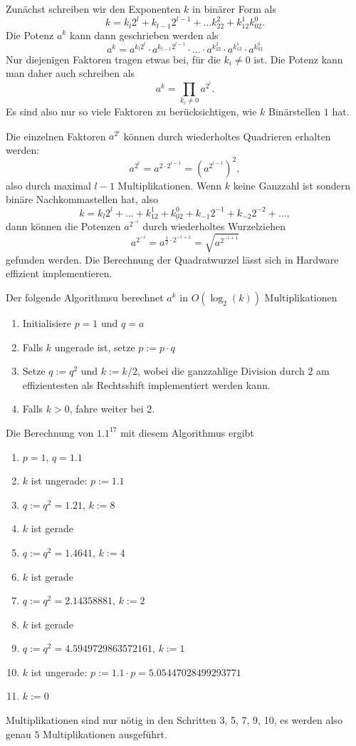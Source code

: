 Zunächst schreiben wir den Exponenten $k$ in binärer Form als
\[
k = k_l2^l + k_{l-1}2^{l-1} + \dots k_22^2+k_12^1 k_02^0.
\]
Die Potenz $a^k$ kann dann geschrieben werden als
\[
a^k
=
a^{k_l2^l} \cdot a^{k_{l-1}2^{l-1}} \cdot \dots \cdot
a^{k_22^2} \cdot a^{k_12^1} \cdot a^{k_02^0}
\]
Nur diejenigen Faktoren tragen etwas bei, für die $k_i\ne 0$ ist.
Die Potenz kann man daher auch schreiben als
\[
a^k
=
\prod_{k_i\ne 0} a^{2^i}.
\]
Es sind also nur so viele Faktoren zu berücksichtigen, wie $k$ 
Binärstellen $1$ hat.

Die einzelnen Faktoren $a^{2^i}$ können durch wiederholtes Quadrieren
erhalten werden:
\[
a^{2^i} = a^{2\cdot 2^{i-1}} = (a^{2^{i-1}})^2,
\]
also durch maximal $l-1$ Multiplikationen.
Wenn $k$ keine Ganzzahl ist sondern binäre Nachkommastellen hat, also
\[
k=k_l2^l + \dots + k_12^1 + k_02^0 + k_{-1}2^{-1} + k_{-2}2^{-2}+\dots,
\]
dann können die Potenzen $a^{2^{-i}}$ durch wiederholtes Wurzelziehen
\[
a^{2^{-i}} = a^{\frac12\cdot 2^{-i+1}} = \sqrt{a^{2^{-i+1}}}
\]
gefunden werden.
Die Berechnung der Quadratwurzel lässt sich in Hardware effizient
implementieren.

\begin{algorithmus}
Der folgende Algorithmsu berechnet $a^k$ in $O(\log_2(k))$
Multiplikationen
\begin{enumerate}
\item Initialisiere $p=1$ und $q=a$
\item Falls $k$ ungerade ist, setze $p:=p\cdot q$ 
\item Setze $q:=q^2$ und $k := k/2$, wobei die ganzzahlige Division durch $2$
am effizientesten als Rechtsshift implementiert werden kann.
\item Falls $k>0$, fahre weiter bei 2.
\end{enumerate}
\end{algorithmus}

\begin{beispiel}
Die Berechnung von $1.1^{17}$ mit diesem Algorithmus ergibt
\begin{enumerate}
\item $p=1$, $q=1.1$
\item $k$ ist ungerade: $p:=1.1$
\item $q:=q^2=1.21$, $k := 8$
\item $k$ ist gerade
\item $q:=q^2=1.4641$, $k := 4$
\item $k$ ist gerade
\item $q:=q^2=2.14358881$, $k := 2$
\item $k$ ist gerade
\item $q:=q^2=4.5949729863572161$, $k := 1$
\item $k$ ist ungerade: $p:=1.1\cdot p = 5.05447028499293771$
\item $k:=0$
\end{enumerate}
Multiplikationen sind nur nötig in den Schritten 3, 5, 7, 9, 10, es
werden also genau $5$ Multiplikationen ausgeführt.
\end{beispiel}

